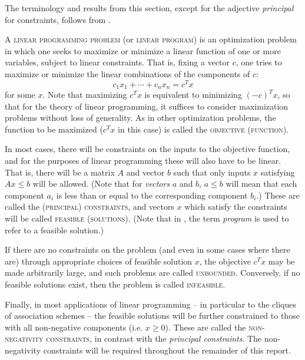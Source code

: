 \documentclass{report}
\begin{document}
    The terminology and results from this section,
    except for the adjective \textit{principal} for
    constraints, follows from \cite{matousek}.

    A \textsc{linear programming problem} (or \textsc{linear program})
    is an optimization problem in which one seeks to maximize or minimize
    a linear function of one or more variables, subject to linear constraints.
    That is, fixing a vector $c$, one tries to maximize or minimize
    the linear combinations of the components of $c$:
    $$
      c_1 x_1 + \cdots + c_n x_n = c^T x
    $$
    for some $x$.
    Note that maximizing $c^T x$ is equivalent to minimizing $(-c)^T x$,
    so that for the theory of linear programming,
    it suffices to consider maximization problems without loss of generality.
    As in other optimization problems,
    the function to be maximized ($c^T x$ in this case)
    is called the \textsc{objective (function)}.

    In most cases, there will be constraints on the inputs to the objective
    function, and for the purposes of linear programming these will also have
    to be linear.
    That is, there will be a matrix $A$ and vector $b$
    such that only inputs $x$ satisfying $Ax \leq b$ will be allowed.
    (Note that for \textit{vectors} $a$ and $b$,
    $a \leq b$ will mean that each component $a_i$
    is less than or equal to the corresponding component $b_i$.)
    These are called the \textsc{(principal) constraints},
    and vectors $x$ which satisfy the constraints will be called
    \textsc{feasible (solutions)}.
    (Note that in \cite{delsarte}, the term \textit{program}
    is used to refer to a feasible solution.)

    If there are no constraints on the problem
    (and even in some cases where there are)
    through appropriate choices of feasible solution $x$,
    the objective $c^Tx$ may be made arbitrarily large,
    and such problems are called \textsc{unbounded}.
    Conversely, if no feasible solutions exist,
    then the problem is called \textsc{infeasible}.

    Finally, in most applications of linear programming --
    in particular to the cliques of association schemes --
    the feasible solutions will be further constrained
    to those with all non-negative components (i.e. $x \geq 0$).
    These are called the \textsc{non-negativity constraints},
    in contrast with the \textit{principal constraints}.
    The non-negativity constraints will be required throughout the remainder of
    this report.
\end{document}
